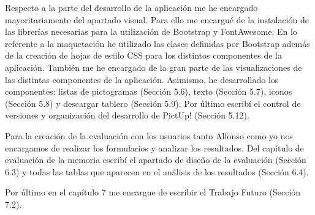 Respecto a la parte del desarrollo de la aplicación me he encargado mayoritariamente del apartado visual. Para ello me encargué de la instalación de las librerías necesarias para la utilización de Bootstrap y FontAwesome. En lo referente a la maquetación he utilizado las clases definidas por Bootstrap además de la creación de hojas de estilo CSS para los distintos componentes de la aplicación. También me he encargado de la gran parte de las visualizaciones de las distintas componentes de la aplicación. Asimismo, he desarrollado los componentes: listas de pictogramas (Sección 5.6), texto (Sección 5.7), iconos (Sección 5.8) y descargar tablero (Sección 5.9). Por último escribí el control de versiones y organización del desarrollo de PictUp! (Sección 5.12).


Para la creación de la evaluación con los usuarios tanto Alfonso como yo nos encargamos de realizar los formularios y analizar los resultados. Del capítulo de evaluación de la memoria escribí el apartado de diseño de la evaluación (Sección 6.3) y todas las tablas que aparecen en el análisis de los resultados (Sección 6.4).


Por último en el capítulo 7 me encargue de escribir el Trabajo Futuro (Sección 7.2).












